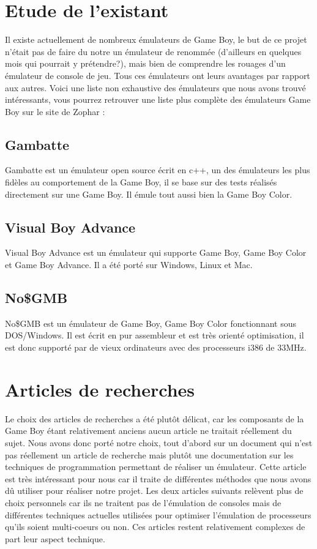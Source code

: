 \documentclass{report}
\begin{document}
\section{Etude de l'existant}
Il existe actuellement de nombreux émulateurs de Game Boy, le but de ce projet n'était pas de faire du notre un émulateur de renommée (d'ailleurs en quelques mois qui pourrait y prétendre?), mais bien de comprendre les rouages d'un émulateur de console de jeu.
Tous ces émulateurs ont leurs avantages par rapport aux autres. Voici une liste non exhaustive des émulateurs que nous avons trouvé intéressants, vous pourrez retrouver une liste plus complète des émulateurs Game Boy sur le site de Zophar \cite{zophar}:

\subsection{Gambatte}
Gambatte \cite{gambatte} est un émulateur open source écrit en c++, un des émulateurs les plus fidèles au comportement de la Game Boy, il se base sur des tests réalisés directement sur une Game Boy. Il émule tout aussi bien la Game Boy Color.
\subsection{Visual Boy Advance}
Visual Boy Advance \cite{visualboyadv} est un émulateur qui supporte Game Boy, Game Boy Color et Game Boy Advance. Il a été porté sur Windows, Linux et Mac.
\subsection{No\$GMB}
No\$GMB \cite{nogmb} est un émulateur de Game Boy, Game Boy Color fonctionnant sous DOS/Windows. Il est écrit en pur assembleur et est très orienté optimisation, il est donc supporté par de vieux ordinateurs avec des processeurs i386 de 33MHz.
\section{Articles de recherches}
Le choix des articles de recherches a été plutôt délicat, car les composants de la Game Boy étant relativement anciens aucun article ne traitait réellement du sujet. Nous avons donc porté notre choix, tout d'abord sur un document qui n'est pas réellement un article de recherche mais plutôt une documentation sur les techniques de programmation permettant de réaliser un émulateur. Cette article est très intéressant pour nous car il traite de différentes méthodes que nous avons dû utiliser pour réaliser notre projet. Les deux articles suivants relèvent plus de choix personnels car ils ne traitent pas de l'émulation de consoles mais de différentes techniques actuelles utilisées pour optimiser l'émulation de processeurs qu'ils soient multi-coeurs ou non. Ces articles restent relativement complexes de part leur aspect technique.
\end{document}
